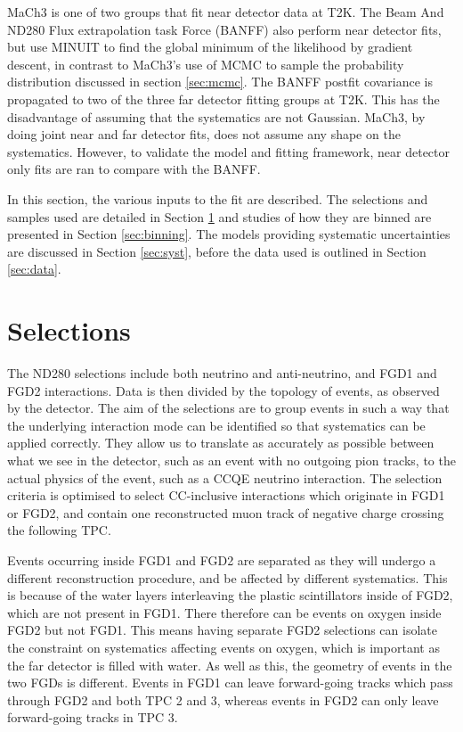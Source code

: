 MaCh3 is one of two groups that fit near detector data at T2K. The Beam And ND280 Flux extrapolation task Force (BANFF) also perform near detector fits, but use MINUIT to find the global minimum of the likelihood by gradient descent, in contrast to MaCh3's use of MCMC to sample the probability distribution discussed in section \ref{sec:mcmc}. The BANFF postfit covariance is propagated to two of the three far detector fitting groups at T2K. This has the disadvantage of assuming that the systematics are not Gaussian. MaCh3, by doing joint near and far detector fits, does not assume any shape on the systematics. However, to validate the model and fitting framework, near detector only fits are ran to compare with the BANFF.

In this section, the various inputs to the fit are described. The selections and samples used are detailed in Section \ref{sec:sel} and studies of how they are binned are presented in Section \ref{sec:binning}. The models providing systematic uncertainties are discussed in Section \ref{sec:syst}, before the data used is outlined in Section \ref{sec:data}.

\section{Selections}\label{sec:sel}

The ND280 selections include both neutrino and anti-neutrino, and FGD1 and FGD2 interactions. Data is then divided by the topology of events, as observed by the detector. The aim of the selections are to group events in such a way that the underlying interaction mode can be identified so that systematics can be applied correctly. They allow us to translate as accurately as possible between what we see in the detector, such as an event with no outgoing pion tracks, to the actual physics of the event, such as a CCQE neutrino interaction. The selection criteria is optimised to select CC-inclusive interactions which originate in FGD1 or FGD2, and contain one reconstructed muon track of negative charge crossing the following TPC.

Events occurring inside FGD1 and FGD2 are separated as they will undergo a different reconstruction procedure, and be affected by different systematics. This is because of the water layers interleaving the plastic scintillators inside of FGD2, which are not present in FGD1. There therefore can be events on oxygen inside FGD2 but not FGD1. This means having separate FGD2 selections can isolate the constraint on systematics affecting events on oxygen, which is important as the far detector is filled with water. As well as this, the geometry of events in the two FGDs is different. Events in FGD1 can leave forward-going tracks which pass through FGD2 and both TPC 2 and 3, whereas events in FGD2 can only leave forward-going tracks in TPC 3.

